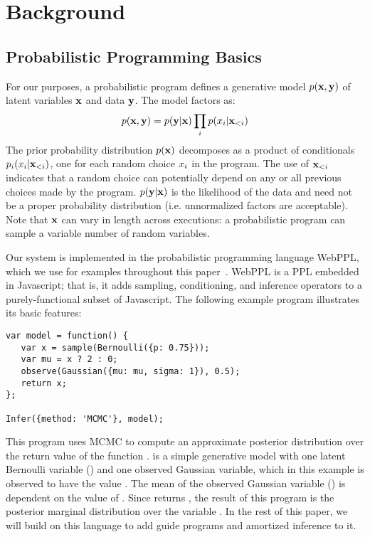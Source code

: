 \section{Background}
\label{sec:background}

\subsection{Probabilistic Programming Basics}
\label{sec:pplbasics}

For our purposes, a probabilistic program defines a generative model $p(\mathbf{x}, \mathbf{y})$ of latent variables $\mathbf{x}$ and data $\mathbf{y}$. The model factors as:
\begin{equation}
p(\mathbf{x}, \mathbf{y}) = p(\mathbf{y} | \mathbf{x}) \prod_i p(x_i | \mathbf{x}_{<i})
\label{eq:probProgDef}
\end{equation}
The prior probability distribution $p(\mathbf{x})$ decomposes as a product of conditionals $p_i(x_i | \mathbf{x}_{<i})$, one for each random choice $x_i$ in the program. The use of $\mathbf{x}_{<i}$ indicates that a random choice can potentially depend on any or all previous choices made by the program.
$p(\mathbf{y} | \mathbf{x})$ is the likelihood of the data and need not be a proper probability distribution (i.e. unnormalized factors are acceptable).
Note that $\mathbf{x}$ can vary in length across executions: a probabilistic program can sample a variable number of random variables.

Our system is implemented in the probabilistic programming language WebPPL, which we use for examples throughout this paper~\cite{WebPPL}.
WebPPL is a PPL embedded in Javascript; that is, it adds sampling, conditioning, and inference operators to a purely-functional subset of Javascript.
The following example program illustrates its basic features:
\begin{lstlisting}
var model = function() {
   var x = sample(Bernoulli({p: 0.75}));
   var mu = x ? 2 : 0;
   observe(Gaussian({mu: mu, sigma: 1}), 0.5);
   return x;
};

Infer({method: 'MCMC'}, model);
\end{lstlisting}
This program uses MCMC to compute an approximate posterior distribution over the return value of the function .  is a simple generative model with one latent Bernoulli variable () and one observed Gaussian variable, which in this example is observed to have the value . The mean of the observed Gaussian variable () is dependent on the value of . Since  returns , the result of this program is the posterior marginal distribution over the variable .
In the rest of this paper, we will build on this language to add guide programs and amortized inference to it.

